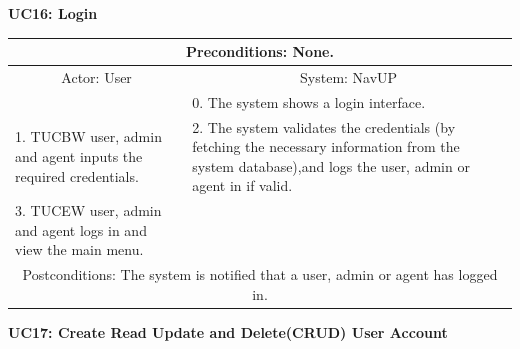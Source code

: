 ﻿\documentclass{article}
\begin{document}
				\vspace{5mm}
                \begin{flushleft}
                \textbf{UC16: Login}\\
				\end{flushleft}
        		\centering		
       		 \small
       		 \begin{tabular}{|p{6cm}|p{6cm}|}
       		 \hline
       		 \multicolumn{2}{c}{Preconditions: None.} \\
       		 \hline
       		\multicolumn{1}{c}{Actor: User} & \multicolumn{1}{c}{ System: NavUP} \\
        		\hline
       		 &0.	The system shows a login interface.\\
       		 \hline
       		1.	TUCBW user, admin and agent inputs the required credentials.
 &2.	The system validates the credentials (by fetching the necessary information from the system database),and logs the user, admin or agent in if valid.
\\
        		\hline
       		3.	TUCEW user, admin and agent logs in and view the main menu.&\\
       		 \hline
        		\multicolumn{2}{c}{Postconditions: The system is notified that a user, admin or agent has logged in. } \\
        		\hline
        \end{tabular} 
         \newpage
				\vspace{5mm}
                \textbf{UC17: Create Read Update and Delete(CRUD) User Account}\\
                \vspace{3mm}
        		\centering
      		 \small
\end{document}

